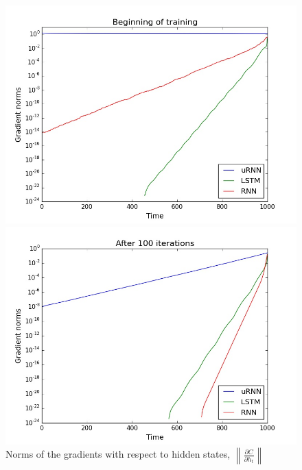 \documentclass{article} %
\newcommand\norm[1]{\left\lVert#1\right\rVert}
\begin{document}
\begin{figure}[t!] 
  \label{fig:gradnorms} 
  \begin{minipage}[b]{0.5\linewidth}
    \centering
    \includegraphics[scale=0.25]{figures/grads_0.jpeg}
  \end{minipage}%
  \begin{minipage}[b]{0.5\linewidth}
    \centering
    \includegraphics[scale=0.25]{figures/grads_100.jpeg}
  \end{minipage}
  \caption{Norms of the gradients with respect to hidden states, $\norm{\frac{\partial C}{\partial h_t}}$}
\end{figure}
\end{document}
